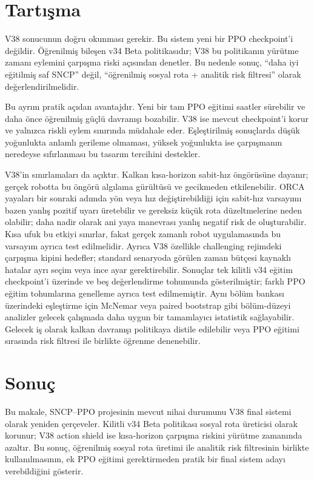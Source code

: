 \documentclass[conference]{IEEEtran}
\begin{document}
\section{Tartışma}
V38 sonucunun doğru okunması gerekir. Bu sistem yeni bir PPO checkpoint'i değildir. Öğrenilmiş bileşen v34
Beta politikasıdır; V38 bu politikanın yürütme zamanı eylemini çarpışma riski açısından denetler. Bu nedenle sonuç,
``daha iyi eğitilmiş saf SNCP'' değil, ``öğrenilmiş sosyal rota + analitik risk filtresi'' olarak
değerlendirilmelidir.

Bu ayrım pratik açıdan avantajdır. Yeni bir tam PPO eğitimi saatler sürebilir ve daha önce öğrenilmiş güçlü
davranışı bozabilir. V38 ise mevcut checkpoint'i korur ve yalnızca riskli eylem sınırında müdahale eder.
Eşleştirilmiş sonuçlarda düşük yoğunlukta anlamlı gerileme olmaması, yüksek yoğunlukta ise çarpışmanın
neredeyse sıfırlanması bu tasarım tercihini destekler.

V38'in sınırlamaları da açıktır. Kalkan kısa-horizon sabit-hız öngörüsüne dayanır; gerçek robotta bu öngörü
algılama gürültüsü ve gecikmeden etkilenebilir. ORCA yayaları bir sonraki adımda yön veya hız değiştirebildiği
için sabit-hız varsayımı bazen yanlış pozitif uyarı üretebilir ve gereksiz küçük rota düzeltmelerine neden
olabilir; daha nadir olarak ani yaya manevrası yanlış negatif risk de oluşturabilir. Kısa ufuk bu etkiyi
sınırlar, fakat gerçek zamanlı robot uygulamasında bu varsayım ayrıca test edilmelidir. Ayrıca V38 özellikle
challenging rejimdeki çarpışma kipini hedefler; standard senaryoda görülen zaman bütçesi kaynaklı hatalar ayrı
seçim veya ince ayar gerektirebilir. Sonuçlar tek kilitli v34 eğitim checkpoint'i üzerinde ve beş değerlendirme
tohumunda gösterilmiştir; farklı PPO eğitim tohumlarına genelleme ayrıca test edilmemiştir. Aynı bölüm bankası
üzerindeki eşleştirme için McNemar veya paired bootstrap gibi bölüm-düzeyi analizler gelecek çalışmada daha
uygun bir tamamlayıcı istatistik sağlayabilir. Gelecek iş olarak kalkan davranışı politikaya distile edilebilir
veya PPO eğitimi sırasında risk filtresi ile birlikte öğrenme denenebilir.

\section{Sonuç}
Bu makale, SNCP--PPO projesinin mevcut nihai durumunu V38 final sistemi olarak yeniden çerçeveler. Kilitli
v34 Beta politikası sosyal rota üreticisi olarak korunur; V38 action shield ise kısa-horizon çarpışma riskini
yürütme zamanında azaltır. Bu sonuç, öğrenilmiş sosyal rota üretimi ile analitik risk filtresinin birlikte
kullanılmasının, ek PPO eğitimi gerektirmeden pratik bir final sistem adayı verebildiğini gösterir.



\end{document}
